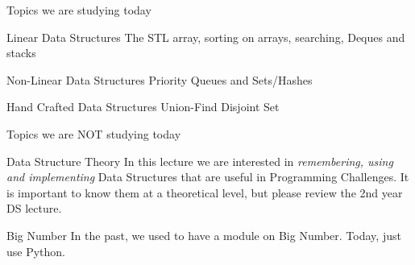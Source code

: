 \begin{frame}{Topics we are studying today}
\begin{block}{Linear Data Structures}
  The STL array, sorting on arrays,
  searching, Deques and stacks
\end{block}

\begin{block}{Non-Linear Data Structures}
  Priority Queues and Sets/Hashes
\end{block}
\begin{block}{Hand Crafted Data Structures}
  Union-Find Disjoint Set
\end{block}
\end{frame}

\begin{frame}{Topics we are NOT studying today}
  \begin{alertblock}{Data Structure Theory}
    In this lecture we are interested in \emph{remembering, using and implementing} Data Structures that are useful in Programming Challenges. It is important to know them at a theoretical level, but please review the 2nd year DS lecture.
  \end{alertblock}
  \begin{alertblock}{Big Number}
    In the past, we used to have a module on Big Number. Today, just use Python.
  \end{alertblock}
\end{frame}
